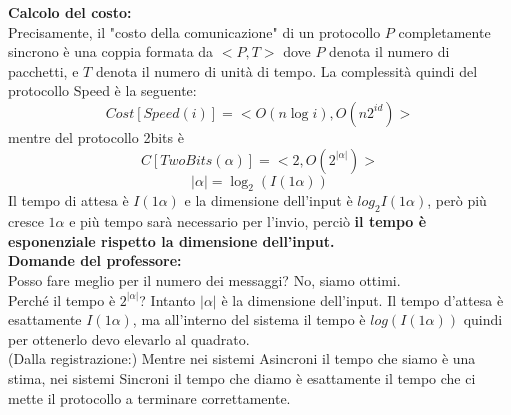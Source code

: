 \textbf{Calcolo del costo:}\\
Precisamente, il "costo della comunicazione" di un protocollo $P$ completamente
sincrono è una coppia formata da $<P,T>$ dove $P$ denota il numero di pacchetti, e
$T$ denota il numero di unità di tempo. La complessità quindi del protocollo Speed
è la seguente:$$Cost[Speed(i)] = <O(n \log i), O(n 2^{id})>$$ mentre del
protocollo 2bits è $$C[TwoBits(\alpha)] = <2, O(2^{|\alpha|})>$$
$$|\alpha|=\log_2(I(1\alpha))$$ Il tempo di attesa è $I(1\alpha)$ e la
dimensione dell'input è $log_2 I(1\alpha)$, però più cresce $1\alpha$ e più
tempo sarà necessario per l'invio, perciò \textbf{il tempo è esponenziale
    rispetto la dimensione dell'input.} \\

\textbf{Domande del professore:}\\
Posso fare meglio per il numero dei messaggi? No, siamo ottimi.\\
Perché il tempo è $2^{|\alpha|}$? Intanto $|\alpha|$ è la dimensione dell'input.
Il tempo d'attesa è esattamente $I(1\alpha)$, ma all'interno del sistema il
tempo è $log(I(1\alpha))$ quindi per ottenerlo devo elevarlo al quadrato.\\
(Dalla registrazione:) Mentre nei sistemi Asincroni il tempo che siamo è una
stima, nei sistemi Sincroni il tempo che diamo è esattamente il tempo che ci
mette il protocollo a terminare correttamente.
